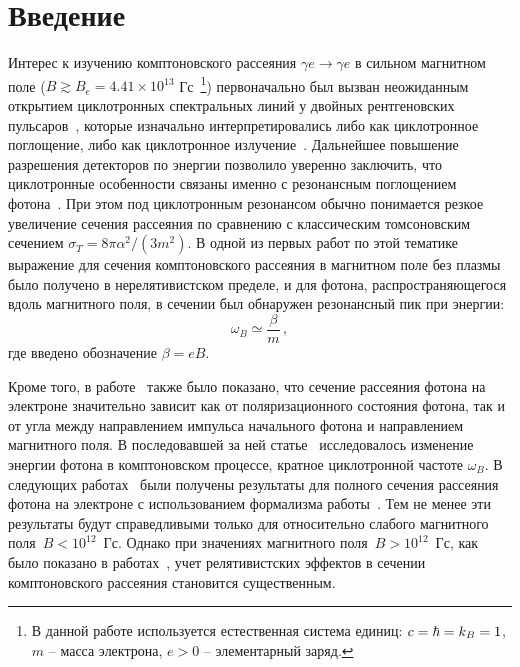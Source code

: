 \documentclass[cp1251%
               ]{jetp} %
\begin{document}
\maketitle

\section{Введение}

Интерес к изучению комптоновского рассеяния $\gamma e \to \gamma e$ в 
сильном магнитном поле ($B\gtrsim B_e = 4.41\times10^{13}$ Гс~\footnote{В данной работе используется естественная система единиц: $c = \hbar = k_{\rm{B}} = 1$, $m$ -- масса электрона, $e > 0$ -- элементарный заряд.}) первоначально был вызван неожиданным открытием циклотронных 
спектральных линий у двойных рентгеновских 
пульсаров~\cite{Truemper1978,Makishima1990,Grove1995}, которые изначально 
интерпретировались либо как циклотронное поглощение, либо как циклотронное 
излучение~\cite{Truemper1978}. Дальнейшее повышение разрешения детекторов по 
энергии позволило уверенно заключить, что циклотронные особенности связаны 
именно с резонансным поглощением фотона~\cite{Mihara:1990}.
При этом под циклотронным резонансом обычно понимается 
резкое увеличение сечения рассеяния по сравнению с классическим томсоновским 
сечением $\sigma_T = 8 \pi \alpha^2 /(3 m^2)$. В одной из первых 
работ по этой тематике~\cite{Canuto:1971} выражение для сечения комптоновского рассеяния в магнитном поле без плазмы было получено в нерелятивистском пределе, и для фотона, распространяющегося вдоль магнитного поля, в сечении был обнаружен резонансный пик при энергии: 
\begin{equation}\label{eq:w_B}
	\omega_B\simeq \frac{\beta}{m}\, ,
\end{equation}
\noindent где введено обозначение $\beta = eB$.

Кроме того, в работе~\cite{Canuto:1971} также было показано, что сечение рассеяния фотона 
на электроне
значительно зависит как от поляризационного состояния фотона, так и от угла 
между направлением импульса начального фотона и направлением магнитного поля. В 
последовавшей за ней 
статье~\cite{Gnedin1973} 
исследовалось изменение энергии фотона в комптоновском процессе, кратное 
циклотронной частоте $\omega_B$. 
В следующих работах~\cite{Borner1979,Ventura:1979} 
были получены результаты для полного сечения рассеяния фотона на электроне с использованием формализма работы~\cite{Canuto:1971}. Тем не менее эти результаты будут справедливыми только для относительно слабого магнитного поля~$B<10^{12}$~Гс. Однако при значениях магнитного поля~$B>10^{12}$~Гс, как было показано в работах~\cite{Herold:1979,Melrose:1983III},   учет релятивистских эффектов в сечении комптоновского рассеяния становится 
существенным.
\end{document}
